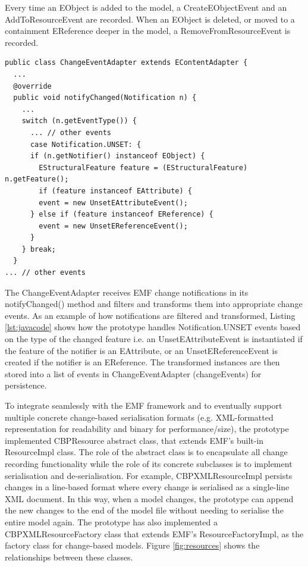 Every time an \textsf{EObject} is added to the model, a \textsf{CreateEObjectEvent} and an \textsf{AddToResourceEvent} are recorded. When an EObject is deleted, or moved to a containment \textsf{EReference} deeper in the model, a \textsf{RemoveFromResourceEvent}
is recorded.

\vspace{-20pt}
\begin{lstlisting}[style=java,caption={Simplified Java code to handle notification events.},label=lst:javacode]
public class ChangeEventAdapter extends EContentAdapter {
  ...
  @override
  public void notifyChanged(Notification n) {
    ...
    switch (n.getEventType()) {
      ... // other events
      case Notification.UNSET: {
      if (n.getNotifier() instanceof EObject) {
        EStructuralFeature feature = (EStructuralFeature) n.getFeature();
        if (feature instanceof EAttribute) {
        event = new UnsetEAttributeEvent();
      } else if (feature instanceof EReference) {
        event = new UnsetEReferenceEvent();
      }
    } break;
  } 
... // other events
\end{lstlisting}	

The \textsf{ChangeEventAdapter} receives EMF change notifications in its \textsf{notifyChanged()} method and filters and transforms them into appropriate change events. As an example of how notifications are filtered and transformed, Listing \ref{lst:javacode} shows how the prototype handles \textsf{Notification.UNSET} events based on the type of the changed feature i.e. an \textsf{UnsetEAttributeEvent} is instantiated if the feature of the notifier is an \textsf{EAttribute}, or an \textsf{UnsetEReferenceEvent}  is created if the notifier is an \textsf{EReference}. The transformed instances are then stored into a list of events in \textsf{ChangeEventAdapter} (\textsf{changeEvents}) for persistence. 

To integrate seamlessly with the EMF framework and to eventually support multiple concrete change-based serialisation formats (e.g. XML-formatted representation for readability and binary for performance/size), the prototype implemented \textsf{CBPResource} abstract class, that extends EMF's built-in \textsf{ResourceImpl} class. The role of the abstract class is to encapsulate all change recording functionality while the role of its concrete subclasses is to implement serialisation and de-serialisation. For example, \textsf{CBPXMLResourceImpl} persists changes in a line-based format where every change is serialised as a single-line XML document. In this way, when a model changes, the prototype can append the new changes to the end of the model file without needing to serialise the entire model again. The prototype has also implemented a \textsf{CBPXMLResourceFactory} class that extends EMF's \textsf{ResourceFactoryImpl}, as the factory class for change-based models. Figure \ref{fig:resources} shows the relationships between these classes.

